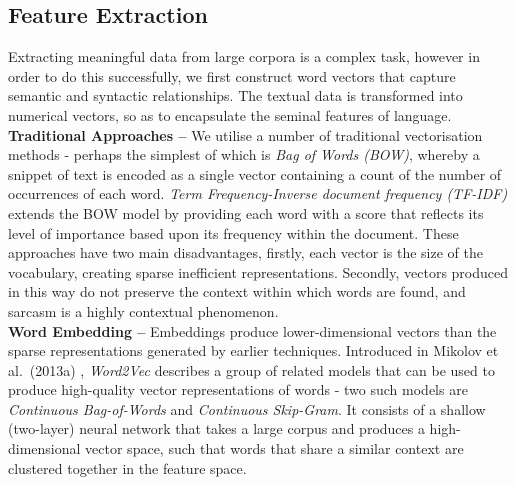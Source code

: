 \documentclass[12pt,a4paper]{article}
\begin{document}

\subsection{Feature Extraction}
\noindent Extracting meaningful data from large corpora is a complex task, however in order to do this successfully, we first construct word vectors that capture semantic and syntactic relationships. The textual data is transformed into numerical vectors, so as to encapsulate the seminal features of language.\\

\noindent \textbf{Traditional Approaches --} We utilise a number of traditional vectorisation methods - perhaps the simplest of which is \textit{Bag of Words (BOW)}, whereby a snippet of text is encoded as a single vector containing a count of the number of occurrences of each word. \textit{Term Frequency-Inverse document frequency (TF-IDF)} \cite{robertson1976relevance} extends the BOW model by providing each word with a score that reflects its level of importance based upon its frequency within the document. These approaches have two main disadvantages, firstly, each vector is the size of the vocabulary, creating sparse inefficient representations. Secondly, vectors produced in this way do not preserve the context within which words are found, and sarcasm is a highly contextual phenomenon. \\

\noindent \textbf{Word Embedding --} Embeddings produce lower-dimensional vectors than the sparse representations generated by earlier techniques. Introduced in Mikolov et al.\ (2013a) \cite{mikolov2013efficient}, \textit{Word2Vec} describes a group of related models that can be used to produce high-quality vector representations of words - two such models are \textit{Continuous Bag-of-Words} and \textit{Continuous Skip-Gram}. It consists of a shallow (two-layer) neural network that takes a large corpus and produces a high-dimensional vector space, such that words that share a similar context are clustered together in the feature space.
\end{document}
